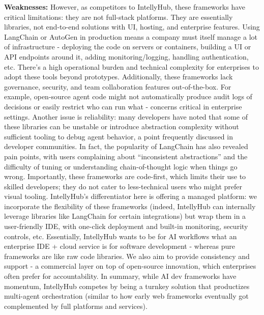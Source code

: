 \documentclass[11pt, a4paper, oneside]{article}
\begin{document}
\textbf{Weaknesses:} However, as competitors to IntellyHub, these frameworks have critical limitations: they are not full-stack platforms. They are essentially libraries, not end-to-end solutions with UI, hosting, and enterprise features. Using LangChain or AutoGen in production means a company must itself manage a lot of infrastructure - deploying the code on servers or containers, building a UI or API endpoints around it, adding monitoring/logging, handling authentication, etc. There's a high operational burden and technical complexity for enterprises to adopt these tools beyond prototypes. Additionally, these frameworks lack governance, security, and team collaboration features out-of-the-box. For example, open-source agent code might not automatically produce audit logs of decisions or easily restrict who can run what - concerns critical in enterprise settings. Another issue is reliability: many developers have noted that some of these libraries can be unstable or introduce abstraction complexity without sufficient tooling to debug agent behavior, a point frequently discussed in developer communities\cite{langchainCritique}. In fact, the popularity of LangChain has also revealed pain points, with users complaining about “inconsistent abstractions” and the difficulty of tuning or understanding chain-of-thought logic when things go wrong. Importantly, these frameworks are code-first, which limits their use to skilled developers; they do not cater to less-technical users who might prefer visual tooling. IntellyHub's differentiator here is offering a managed platform: we incorporate the flexibility of these frameworks (indeed, IntellyHub can internally leverage libraries like LangChain for certain integrations) but wrap them in a user-friendly IDE, with one-click deployment and built-in monitoring, security controls, etc. Essentially, IntellyHub wants to be for AI workflows what an enterprise IDE + cloud service is for software development - whereas pure frameworks are like raw code libraries. We also aim to provide consistency and support - a commercial layer on top of open-source innovation, which enterprises often prefer for accountability. In summary, while AI dev frameworks have momentum, IntellyHub competes by being a turnkey solution that productizes multi-agent orchestration (similar to how early web frameworks eventually got complemented by full platforms and services).
\end{document}
